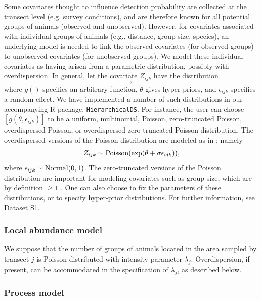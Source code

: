 \documentclass[10pt]{article}
\begin{document}
Some covariates thought to influence detection probability are collected at the transect level (e.g. survey conditions), and are therefore known for all potential groups of animals (observed and unobserved).  However, for covariates associated with individual groups of animals (e.g., distance, group size, species), an underlying model is needed to link the observed covariates (for observed groups) to unobserved covariates (for unobserved groups).  We model these individual covariates as having arisen from a parametric distribution, possibly with overdispersion.  In general, let the covariate $Z_{ijk}$ have the distribution 
\begin{equation}
[g(\theta,\epsilon_{ijk})],
\label{eq:cov.dist}
\end{equation}
where $g()$ specifies an arbitrary function, $\theta$ gives hyper-priors, and $\epsilon_{ijk}$ specifies a random effect.  We have implemented a number of such distributions in our accompanying R package, {\tt HierarchicalDS}.  For instance, the user can choose $[g(\theta,\epsilon_{ijk})]$ to be a uniform, multinomial, Poisson, zero-truncated Poisson, overdispersed Poisson, or overdispersed zero-truncated Poisson distribution.  The overdispersed versions of the Poisson distribution are modeled as in \cite{McClintockEtAl2009}; namely
$$
Z_{ijk} \sim {\rm Poisson}(\exp(\theta+\sigma \epsilon_{ijk})),
$$
where $\epsilon_{ijk} \sim {\rm Normal}(0,1)$.
The zero-truncated versions of the Poisson distribution are important for modeling covariates such as group size, which are by definition $\ge 1$ \cite{Royle2008}.
One can also choose to fix the parameters of these distributions, or to specify hyper-prior distributions.  For further information, see Dataset S1.

\subsubsection*{Local abundance model}
We suppose that the number of groups of animals located in the area sampled by transect $j$ is Poisson distributed with intensity parameter $\lambda_j$.  Overdispersion, if present, can be accommodated in the specification of $\lambda_j$, as described below.

\subsubsection*{Process model}
\end{document}
